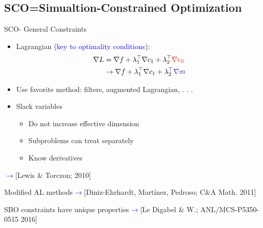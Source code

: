 \documentclass[handout,aspectratio=54]{beamer}
\numberwithin{theorem}{section}
\begin{document}
\subsection{SCO=Simualtion-Constrained Optimization}
\begin{frame}{SCO- General Constraints}
\colorbox[rgb]{0.5,0.6,0.7}{\textcolor{white}{$\min\{f(x):c_1(x)=0,c_S(x)=0\}$}}
\begin{itemize}
\item Lagrangian (\textcolor{blue}{key to optimality conditions}):
\begin{align*}
\nabla L&=\nabla f+\lambda_1^\top\nabla c_1+\lambda_2^\top \textcolor{red}{\rm\nabla c_S}\\
&\rightarrow\nabla f+\lambda_1^\top\nabla c_1+\lambda_2^\top \textcolor{blue}{\nabla m}
\end{align*}

\item Use favorite method: filters, augmented Lagrangian, . . .
\item Slack variables
\begin{itemize}
\item Do not increase effective dimension
\item Subproblems can treat separately
\item Know derivatives
\end{itemize}
\end{itemize}

\flushright\scriptsize
\textcolor{blue}{$\rightarrow$}\textcolor[RGB]{128,0,128}{[Lewis \& Torczon; 2010]}

Modified AL methods\textcolor{blue}{$\rightarrow$}\textcolor[RGB]{128,0,128}{[Diniz-Ehrhardt, Mart\'{i}nez, Pedroso; C\&A Math. 2011]}

SBO constraints have unique properties\textcolor{blue}{$\rightarrow$}\textcolor[RGB]{128,0,128}{[Le Digabel \& W.; ANL/MCS-P5350-0515 2016]}
\end{frame}
\end{document}
